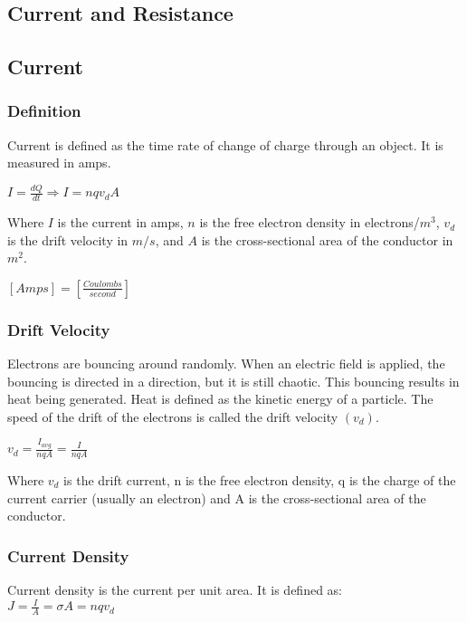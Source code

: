 \begin{center}
    \section{Current and Resistance}
    \hrulefill
    \subsection*{Current}
\end{center}

\subsubsection*{Definition}
\hspace{.5cm} Current is defined as the time rate of change of charge through an object. It is measured in amps.

\vbox{
    \large\center
    $I=\frac{dQ}{dt} \Rightarrow I = nqv_dA$
}\vspace{12pt}

Where $I$ is the current in amps, $n$ is the free electron density in electrons/$m^3$, 
$v_d$ is the drift velocity in $m/s$, and $A$ is the cross-sectional area of the conductor in $m^2$.

\vbox {
    \large\center
    $[Amps] = [\frac{Coulombs}{second}]$
}


\subsubsection*{Drift Velocity}
Electrons are bouncing around randomly. When an electric field is applied, the bouncing is directed 
in a direction, but it is still chaotic. This bouncing results in heat being generated. Heat is defined 
as the kinetic energy of a particle. The speed of the drift of the electrons is called the drift velocity $(v_d)$.

\vbox{
    \large\center
    $v_d = \frac{I_{avg}}{nqA} = \frac{I}{nqA}$\\
}\vspace{12pt}

Where $v_d$ is the drift current, n is the free electron density, q is the charge of the current carrier 
(usually an electron) and A is the cross-sectional area of the conductor.


\pagebreak



\subsubsection*{Current Density}
\hspace{.5cm} Current density is the current per unit area. It is defined as:\\
\vbox{
    \large\center
    $J = \frac{I}{A} = \sigma A = nqv_d$
}\vspace{12pt}

